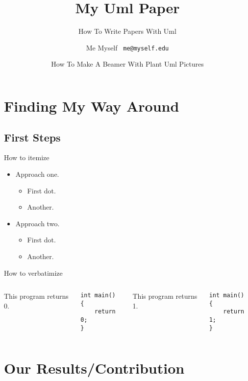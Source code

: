 \documentclass{beamer}
\title{My Uml Paper}
\subtitle{How To Write Papers With Uml}
\author[Me]{Me Myself \ \texttt{me@myself.edu}}
\date[UML2015]{How To Make A Beamer With Plant Uml Pictures}
\begin{document}
\begin{frame}
  \titlepage
\end{frame}

\begin{frame}
  \tableofcontents
\end{frame}

\section{Finding My Way Around}

\subsection{First Steps}

\begin{frame}{How to itemize}
  	\begin{itemize}
  	    \item Approach one.
	  	\begin{itemize}
		    \item First dot.
		    \item Another.
	    \end{itemize}  	
  	    \item Approach two.
	  	\begin{itemize}
		    \item First dot.
		    \item Another.
	    \end{itemize}
    \end{itemize}
\end{frame}

\begin{frame}[fragile]{How to verbatimize}
	\begin{columns}
			This program returns 0.
			\begin{verbatim}
int main()
{
    return 0;
}
			\end{verbatim}
			This program returns 1.
			\begin{verbatim}
int main()
{
    return 1;
}
			\end{verbatim}
	\end{columns}
\end{frame}

\section{Our Results/Contribution}
\end{document}
